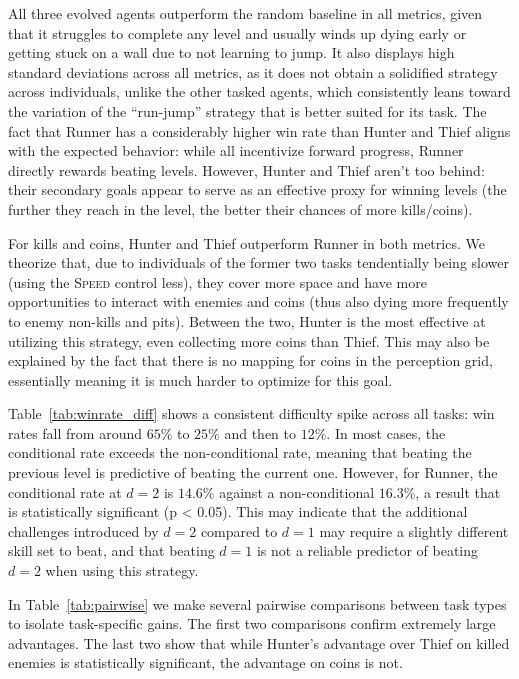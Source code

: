 \documentclass[runningheads]{llncs}
\begin{document}
All three evolved agents outperform the random baseline in all metrics, given that it struggles to complete any level and usually winds up dying early or getting stuck on a wall due to not learning to jump. It also displays high standard deviations across all metrics, as it does not obtain a solidified strategy across individuals, unlike the other tasked agents, which consistently leans toward the variation of the ``run-jump'' strategy that is better suited for its task. The fact that Runner has a considerably higher win rate than Hunter and Thief aligns with the expected behavior: while all incentivize forward progress, Runner directly rewards beating levels. However, Hunter and Thief aren't too behind: their secondary goals appear to serve as an effective proxy for winning levels (the further they reach in the level, the better their chances of more kills/coins). 

For kills and coins, Hunter and Thief outperform Runner in both metrics. We theorize that, due to individuals of the former two tasks tendentially being slower (using the \textsc{Speed} control less), they cover more space and have more opportunities to interact with enemies and coins (thus also dying more frequently to enemy non-kills and pits). Between the two, Hunter is the most effective at utilizing this strategy, even collecting more coins than Thief. This may also be explained by the fact that there is no mapping for coins in the perception grid, essentially meaning it is much harder to optimize for this goal. 

Table~\ref{tab:winrate_diff} shows a consistent difficulty spike across all tasks: win rates fall from around $65\%$ to $25\%$ and then to $12\%$. In most cases, the conditional rate exceeds the non-conditional rate, meaning that beating the previous level is predictive of beating the current one. However, for Runner, the conditional rate at $d=2$ is $14.6\%$ against a non-conditional $16.3\%$, a result that is statistically significant (p < 0.05). This may indicate that the additional challenges introduced by $d=2$ compared to $d=1$ may require a slightly different skill set to beat, and that beating $d=1$ is not a reliable predictor of beating $d=2$ when using this strategy.

In Table~\ref{tab:pairwise} we make several pairwise comparisons between task types to isolate task-specific gains. The first two comparisons confirm extremely large advantages. The last two show that while Hunter's advantage over Thief on killed enemies is statistically significant, the advantage on coins is not.
\end{document}
